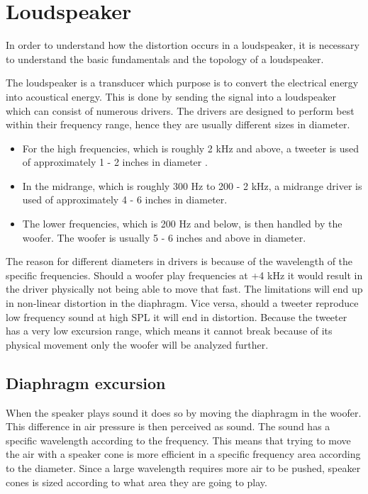 \section{Loudspeaker}

In order to understand how the distortion occurs in a loudspeaker, it is necessary to understand the basic fundamentals and the topology of a loudspeaker. %

The loudspeaker is a transducer which purpose is to convert the electrical energy into acoustical energy. This is done by sending the signal into a loudspeaker which can consist of numerous drivers. The drivers are designed to perform best within their frequency range, hence they are usually different sizes in diameter.
\begin{itemize}
\item[] For the high frequencies, which is roughly 2 kHz and above, a tweeter is used of approximately 1 - 2 inches in diameter \citep{sou:LoudspeakerRange}. 
\item[] In the midrange, which is roughly 300 Hz to 200 - 2 kHz, a midrange driver is used of approximately 4 - 6 inches in diameter.
\item[] The lower frequencies, which is 200 Hz and below, is then handled by the woofer. The woofer is usually 5 - 6 inches and above in diameter.
\end{itemize}
The reason for different diameters in drivers is because of the wavelength of the specific frequencies. Should a woofer play frequencies at +4 kHz it would result in the driver physically not being able to move that fast. The limitations will end up in non-linear distortion in the diaphragm. Vice versa, should a tweeter reproduce low frequency sound at high \gls{SPL} it will end in distortion. %
Because the tweeter has a very low excursion range, which means it cannot break because of its physical movement only the woofer will be analyzed further. 



\subsection*{Diaphragm excursion}
When the speaker plays sound it does so by moving the diaphragm in the woofer. This difference in air pressure is then perceived as sound. The sound has a specific wavelength according to the frequency. This means that trying to move the air with a speaker cone is more efficient in a specific frequency area according to the diameter. %
Since a large wavelength requires more air to be pushed, speaker cones is sized according to what area they are going to play.


